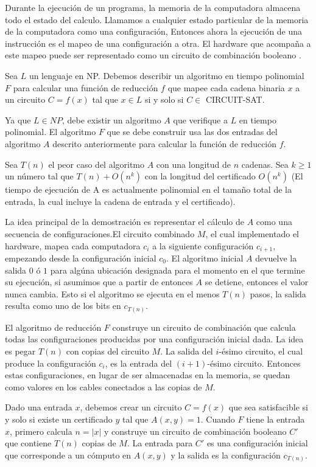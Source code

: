 \documentclass[letterpaper,12pt]{article}
\newcommand{\ccb}{circuito de combinación booleano }
\begin{document}
Durante la ejecución de un programa, la memoria de la computadora almacena todo el
estado del calculo. Llamamos a cualquier estado particular de la memoria de la
computadora como una configuración, Entonces ahora la ejecución de una 
instrucción es el mapeo de una configuración a otra. El hardware que acompaña a este
mapeo puede ser representado como un \ccb.

Sea $L$ un lenguaje en NP. Debemos describir un algoritmo en tiempo polinomial $F$
para calcular una función de reducción $f$ que mapee cada cadena binaria $x$ a un 
circuito $C = f(x)$ tal que $x \in L$ si y solo si $C \in$ CIRCUIT-SAT.

Ya que $L \in NP$, debe existir un algoritmo $A$ que verifique a $L$ en tiempo 
polinomial. El algoritmo $F$ que se debe construir usa las dos entradas del 
algoritmo $A$ descrito anteriormente para calcular la función de reducción $f$.

Sea $T(n)$ el peor caso del algoritmo $A$ con una longitud de $n$ cadenas. Sea
$k \ge 1$ un número tal que $T(n) + O(n^k)$ con la longitud del certificado
$O(n^k)$ (El tiempo de ejecución de A es actualmente polinomial en el tamaño total
de la entrada, la cual incluye la cadena de entrada y el certificado).

La idea principal de la demostración es representar el cálculo de $A$ como una 
secuencia de configuraciones.El circuito combinado $M$, el cual implementado el 
hardware, mapea cada computadora $c_i$ a la siguiente configuración $c_{i+1}$, 
empezando desde la configuración inicial $c_0$. El algoritmo inicial $A$ 
devuelve la salida $0$ ó $1$ para algúna ubicación designada para el momento 
en el que termine su ejecución, si asumimos que a partir de entonces $A$ se 
detiene, entonces el valor nunca cambia. Esto si el algoritmo se ejecuta en 
el menos $T(n)$ pasos, la salida resulta como uno de los bits en $c_{T(n)}$.

El algoritmo de reducción $F$ construye un circuito  de combinación que calcula
todas las configuraciones producidas por una configuración inicial dada. La idea
es pegar $T(n)$ con copias del circuito $M$. La salida del $i$-ésimo circuito, el
cual produce la configuración $c_i$, es la entrada del $(i+1)$-ésimo circuito.
Entonces estas configuraciones, en lugar de ser almacenadas en la memoria, 
se quedan como valores en los cables conectados a las copias de $M$.

Dado una entrada $x$, debemos crear un circuito $C = f(x)$ que sea satisfacible si
y solo si existe un certificado $y$ tal que $A(x,y) = 1$. Cuando $F$ tiene la
entrada $x$, primero calcula $n = |x|$ y construye un \ccb $C'$ que contiene $T(n)$
copias de $M$. La entrada para $C'$ es una configuración inicial que corresponde a 
un cómputo en $A(x,y)$ y la salida es la configuración $c_{T(n)}$.
\end{document}
